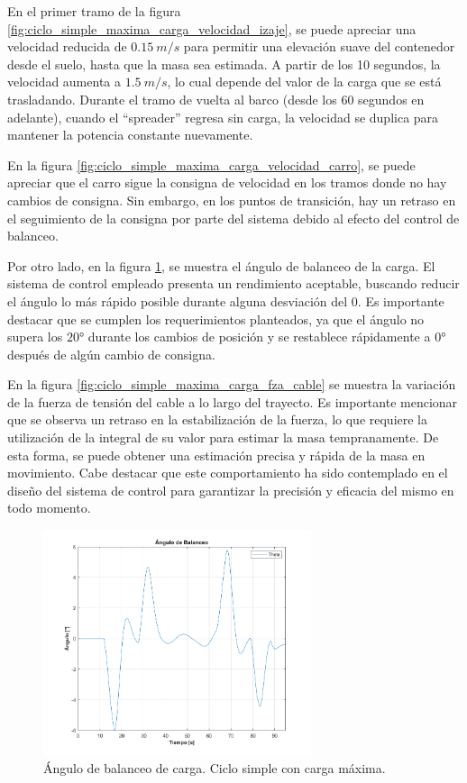 \documentclass[11pt]{article}
\begin{document}
En el primer tramo de la figura \ref{fig:ciclo_simple_maxima_carga_velocidad_izaje}, se puede apreciar una velocidad reducida de $0.15\ m/s$ para permitir una elevación suave del contenedor desde el suelo, hasta que la masa sea estimada. A partir de los 10 segundos, la velocidad aumenta a $1.5\ m/s$, lo cual depende del valor de la carga que se está trasladando. Durante el tramo de vuelta al barco (desde los 60 segundos en adelante), cuando el ``spreader'' regresa sin carga, la velocidad se duplica para mantener la potencia constante nuevamente.

En la figura \ref{fig:ciclo_simple_maxima_carga_velocidad_carro}, se puede apreciar que el carro sigue la consigna de velocidad en los tramos donde no hay cambios de consigna. Sin embargo, en los puntos de transición, hay un retraso en el seguimiento de la consigna por parte del sistema debido al efecto del control de balanceo.

Por otro lado, en la figura \ref{fig:ciclo_simple_maxima_carga_angulo_balanceo}, se muestra el ángulo de balanceo de la carga. El sistema de control empleado presenta un rendimiento aceptable, buscando reducir el ángulo lo más rápido posible durante alguna desviación del 0. Es importante destacar que se cumplen los requerimientos planteados, ya que el ángulo no supera los $20°$ durante los cambios de posición y se restablece rápidamente a $0°$ después de algún cambio de consigna.

En la figura \ref{fig:ciclo_simple_maxima_carga_fza_cable} se muestra la variación de la fuerza de tensión del cable a lo largo del trayecto. Es importante mencionar que se observa un retraso en la estabilización de la fuerza, lo que requiere la utilización de la integral de su valor para estimar la masa tempranamente. De esta forma, se puede obtener una estimación precisa y rápida de la masa en movimiento. Cabe destacar que este comportamiento ha sido contemplado en el diseño del sistema de control para garantizar la precisión y eficacia del mismo en todo momento.

\begin{figure}%
	\centering
	\includegraphics[width=0.7\textwidth]{images/ciclo_simple_maxima_carga/angulo_de_balanceo.png}
	\caption{Ángulo de balanceo de carga. Ciclo simple con carga máxima.}
	\label{fig:ciclo_simple_maxima_carga_angulo_balanceo}
\end{figure}
\end{document}

